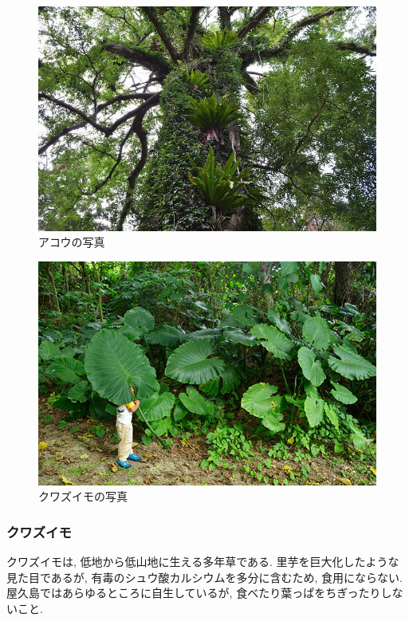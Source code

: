 \documentclass[10pt,titlepage,a5paper]{ltjsbook}
\begin{document}
    \hfill
    \begin{minipage}{0.38\columnwidth}
      \begin{figure}[H]
            \centering
            \includegraphics[width=\columnwidth]{akou.jpg}
            \caption{アコウの写真}
            \label{fig:akou_photo}
        \end{figure}
    \end{minipage}
    \vfill
    \begin{minipage}{0.38\columnwidth}
      \begin{figure}[H]
            \centering
            \includegraphics[width=\columnwidth]{kuwazuimo.jpg}
            \caption{クワズイモの写真}
            \label{fig:kuwazuimo_photo}
        \end{figure}
    \end{minipage}
    \hfill
    \begin{minipage}{0.58\columnwidth}
      \subsubsection*{クワズイモ}
        クワズイモは, 低地から低山地に生える多年草である. 里芋を巨大化したような見た目であるが, 有毒のシュウ酸カルシウムを多分に含むため, 食用にならない. 屋久島ではあらゆるところに自生しているが, 食べたり葉っぱをちぎったりしないこと. 
    \end{minipage}
\end{document}
